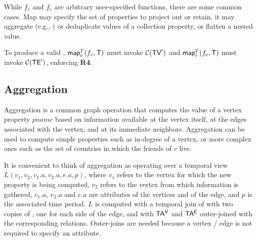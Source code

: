 
While $f_v$ and $f_e$ are arbitrary user-specified functions, there
are some common cases.  Map may specify the set of properties to
project out or retain, it may aggregate (e.g., ) or
deduplicate values of a collection property, or flatten a nested
value.

To produce a valid \tg, $\textsf{map}^T_v(f_v, \mathsf{T})$ must invoke $\mathcal{C}(\textsf{TV}')$
and $\textsf{map}^T_e(f_e, \mathsf{T})$ must invoke $\mathcal{C}(\textsf{TE}')$, enforcing {\bf R4}.





\subsection{Aggregation}
\label{sec:algebra:agg}

Aggregation is a common graph operation that computes the value of a
vertex property $pname$ based on information available at the vertex
itself, at the edges associated with the vertex, and at its immediate
neighbors.  Aggregation can be used to compute simple properties such
as in-degree of a vertex, or more complex ones such as the set of
countries in which the friends of $v$ live.

It is convenient to think of aggregation as operating over a temporal
view $L(v_1,v_2,v_1.a,v_2.a,e.a,p)$, where $v_1$ refers to the vertex
for which the new property is being computed, $v_2$ refers to the
vertex from which information is gathered, $v_1.a$, $v_2.a$ and $e.a$
are attributes of the vertices and of the edge, and $p$ is the
associated time period.  $L$ is computed with a temporal join of \te
with two copies of \tv, one for each side of the edge, and with $\mathsf{TA^{V}}$
and $\mathsf{TA^{E}}$ outer-joined with the corresponding relations.  Outer-joins
are needed because a vertex / edge is not required to specify an
attribute.

